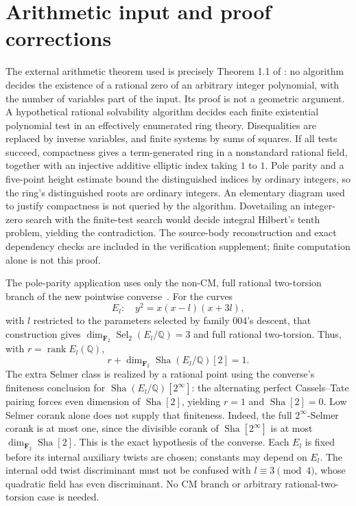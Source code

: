 \documentclass[11pt]{article}
\newcommand{\Q}{\mathbb Q}
\newcommand{\Sha}{\operatorname{Sha}}
\newcommand{\Sel}{\operatorname{Sel}}
\newcommand{\rank}{\operatorname{rank}}
\begin{document}
\section{Arithmetic input and proof corrections}\label{sec:arithmetic}
The external arithmetic theorem used is precisely Theorem 1.1 of
\cite{OpenAI}: no algorithm decides the existence of a rational zero of
an arbitrary integer polynomial, with the number of variables part of the
input. Its proof is not a geometric argument. A hypothetical rational
solvability algorithm decides each finite existential polynomial test in
an effectively enumerated ring theory. Disequalities are replaced by
inverse variables, and finite systems by sums of squares. If all tests
succeed, compactness gives a term-generated ring in a nonstandard rational
field, together with an injective additive elliptic index taking $1$ to $1$.
Pole parity and a five-point height estimate bound the distinguished
indices by ordinary integers, so the ring's distinguished roots are
ordinary integers. An elementary diagram used to justify compactness is
not queried by the algorithm. Dovetailing an integer-zero search with the
finite-test search would decide integral Hilbert's tenth problem, yielding
the contradiction. The source-body reconstruction and exact dependency
checks are included in the verification supplement; finite computation
alone is not this proof.

The pole-parity application uses only the non-CM, full rational
two-torsion branch of the new pointwise converse~\cite{TwoConverse}.
For the curves
\[
 E_l:\quad y^2=x(x-l)(x+3l),
\]
with $l$ restricted to the parameters selected by family 004's descent,
that construction gives $\dim_{\mathbf F_2}\Sel_2(E_l/\Q)=3$ and
full rational two-torsion. Thus, with $r=\rank E_l(\Q)$,
\[
 r+\dim_{\mathbf F_2}\Sha(E_l/\Q)[2]=1.
\]
The extra Selmer class is realized by a rational point using the
converse's finiteness conclusion for $\Sha(E_l/\Q)[2^\infty]$:
the alternating perfect Cassels--Tate pairing forces even dimension
of $\Sha[2]$, yielding $r=1$ and $\Sha[2]=0$.
Low Selmer corank alone does not supply that finiteness.
Indeed, the full $2^\infty$-Selmer corank is at most one, since the
divisible corank of $\Sha[2^\infty]$ is at most
$\dim_{\mathbf F_2}\Sha[2]$. This is the exact hypothesis of the converse.
Each $E_l$ is fixed before its internal auxiliary twists are chosen;
constants may depend on $E_l$. The internal odd twist discriminant must
not be confused with $l\equiv3\pmod4$, whose quadratic field has even
discriminant. No CM branch or arbitrary rational-two-torsion case is needed.
\end{document}
